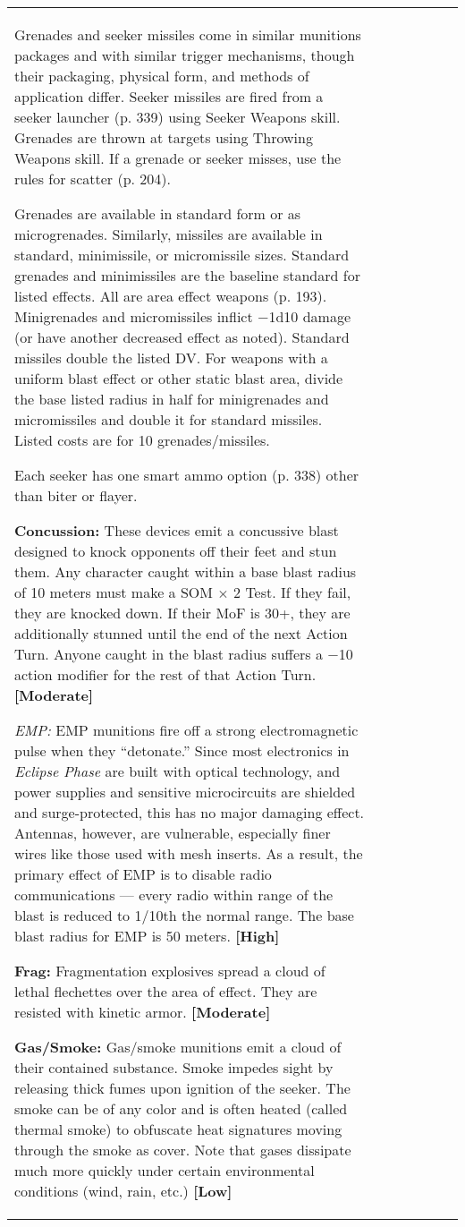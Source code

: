 \begin{tabular}{|l|l|l|l|l|l|l|}
Grenades and seeker missiles come in similar munitions packages and with similar trigger mechanisms, though their packaging, physical form, and methods of application differ. Seeker missiles are fired from a seeker launcher (p. 339) using Seeker Weapons skill. Grenades are thrown at targets using Throwing Weapons skill. If a grenade or seeker misses, use the rules for scatter (p. 204). 

Grenades are available in standard form or as microgrenades. Similarly, missiles are available in standard, minimissile, or micromissile sizes. Standard grenades and minimissiles are the baseline standard for listed effects. All are area effect weapons (p. 193). Minigrenades and micromissiles inflict $-$1d10 damage (or have another decreased effect as noted). Standard missiles double the listed DV. For weapons with a uniform blast effect or other static blast area, divide the base listed radius in half for minigrenades and micromissiles and double it for standard missiles. Listed costs are for 10 grenades/missiles. 

Each seeker has one smart ammo option (p. 338) other than biter or flayer. 

\textbf{Concussion:} These devices emit a concussive blast designed to knock opponents off their feet and stun them. Any character caught within a base blast radius of 10 meters must make a SOM $\times$ 2 Test. If they fail, they are knocked down. If their MoF is 30+, they are additionally stunned until the end of the next Action Turn. Anyone caught in the blast radius suffers a $-$10 action modifier for the rest of that Action Turn. \textbf{[Moderate]} 

\emph{EMP:} EMP munitions fire off a strong electromagnetic pulse when they ``detonate.'' Since most electronics in \emph{Eclipse Phase} are built with optical technology, and power supplies and sensitive microcircuits are shielded and surge-protected, this has no major damaging effect. Antennas, however, are vulnerable, especially finer wires like those used with mesh inserts. As a result, the primary effect of EMP is to disable radio communications --- every radio within range of the blast is reduced to 1/10th the normal range. The base blast radius for EMP is 50 meters. \textbf{[High]} 

\textbf{Frag:} Fragmentation explosives spread a cloud of lethal flechettes over the area of effect. They are resisted with kinetic armor. \textbf{[Moderate]} 

\textbf{Gas/Smoke:} Gas/smoke munitions emit a cloud of their contained substance. Smoke impedes sight by releasing thick fumes upon ignition of the seeker. The smoke can be of any color and is often heated (called thermal smoke) to obfuscate heat signatures moving through the smoke as cover. Note that gases dissipate much more quickly under certain environmental conditions (wind, rain, etc.) \textbf{[Low]} 


\end{tabular}
